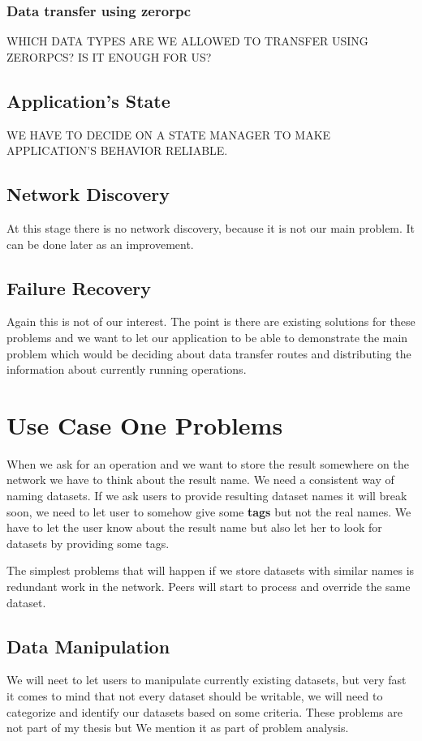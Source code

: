 \subsubsection{Data transfer using zerorpc}
WHICH DATA TYPES ARE WE ALLOWED TO TRANSFER USING ZERORPCS? IS IT ENOUGH FOR US?

\subsection{Application's State}
WE HAVE TO DECIDE ON A STATE MANAGER TO MAKE APPLICATION'S BEHAVIOR RELIABLE.

\subsection{Network Discovery}
At this stage there is no network discovery, because it is not our main problem. It can be done later as an improvement.

\subsection{Failure Recovery}
Again this is not of our interest. The point is there are existing solutions for these problems and we want to let our application to be able to demonstrate the main problem which would be deciding about data transfer routes and distributing the information about currently running operations.

\section{Use Case One Problems}
When we ask for an operation and we want to store the result somewhere on the network we have to think about the result name. 
We need a consistent way of naming datasets. If we ask users to provide resulting dataset names it will break soon, we need to 
let user to somehow give some \textbf{tags} but not the real names. We have to let the user know about the result name but also
let her to look for datasets by providing some tags.

The simplest problems that will happen if we store datasets with similar names is redundant work in the network. Peers will start 
to process and override the same dataset.

\subsection{Data Manipulation}
We will neet to let users to manipulate currently existing datasets, but very fast it comes to mind that not every dataset should be
writable, we will need to categorize and identify our datasets based on some criteria. These problems are not part of my thesis but
We mention it as part of problem analysis.



